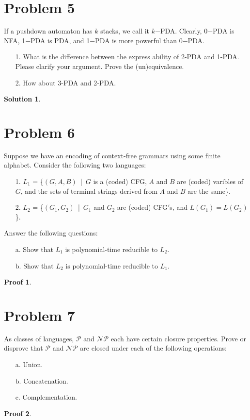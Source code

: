 \documentclass[a4paper,UTF8]{ctexart}
\theoremstyle{definition}
\newtheorem*{solution}{Solution}
\newtheorem*{prove}{Proof}
\begin{document}
\section*{Problem 5}
If a pushdown automaton has $k$ stacks, we call it $k$−PDA. Clearly, 0−PDA is NFA, 1−PDA is PDA, and 1−PDA is more powerful than 0−PDA.
\begin{enumerate}
  \item[1.] What is the difference between the express ability of 2-PDA and 1-PDA. Please clarify your argument. Prove the (un)equivalence.
  \item[2.] How about 3-PDA and 2-PDA.
\end{enumerate}
\begin{solution}
\end{solution}
\newpage

\section*{Problem 6}
Suppose we have an encoding of context-free grammars using some finite alphabet. Consider the following two languages:
\begin{enumerate}
  \item[1.] $L_1$ = \big\{$(G,A,B)$\ |\ $G$ is a (coded) CFG, $A$ and $B$ are (coded) varibles of $G$, and the sets of terminal strings derived from $A$ and $B$ are the same\big\}.
  \item[2.] $L_2$ = \big\{$(G_1,G_2)$\ |\ $G_1$ and $G_2$ are (coded) CFG$'$s, and $L(G_1) = L(G_2)$\big\}.
\end{enumerate}
Answer the following questions:
\begin{enumerate}
  \item[a.] Show that $L_1$ is polynomial-time reducible to $L_2$.
  \item[b.] Show that $L_2$ is polynomial-time reducible to $L_1$.
\end{enumerate}
\begin{prove}
\end{prove}
\newpage

\section*{Problem 7}
As classes of languages, $\mathcal{P}$ and $\mathcal{NP}$ each have certain closure properties. Prove or disprove that $\mathcal{P}$ and $\mathcal{NP}$ are closed under each of the following operations:
\begin{enumerate}
  \item[a.] Union.
  \item[b.] Concatenation.
  \item[c.] Complementation.
\end{enumerate}
\begin{prove}
\end{prove}
\end{document}
